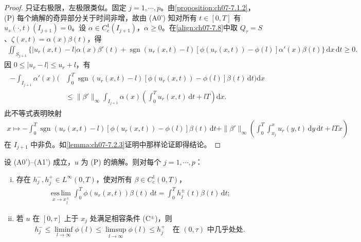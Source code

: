 \documentclass[../../main.tex]{subfiles}%
\begin{document}
\begin{proof}
只证右极限，左极限类似。固定 $j=1,\cdots ,p$。由\cref{proposition:ch07-7.1.2}，(P) 每个熵解的奇异部分关于时间非增，故由 (A0') 知对所有 $t\in[0,T]$ 有 $u_s(\cdot,t)(I_{j+1})=0$。设 $\alpha\in C^1_c(I_{j+1})$，$\alpha\geqslant0$。在\eqref{align:ch07-7.8}中取 $Q_\tau=S$、$\zeta(x,t)=\alpha(x)\beta(t)$，得
\begin{align*}
\iint_{S_{j+1}}\{|u_r(x,t)-l|\alpha(x)\beta'(t)+\operatorname{sgn}(u_r(x,t)-l)[\phi(u_r(x,t))-\phi(l)]\alpha'(x)\beta(t)\}\,\mathrm{d}x\,\mathrm{d}t\geqslant0.
\end{align*}
因 $0\leqslant|u_r-l|\leqslant u_r+l$，有
\begin{align*}
\begin{aligned}
-\int_{I_{j+1}}\alpha'(x)\bigg(&\int_0^T\operatorname{sgn}(u_r(x,t)-l)[\phi(u_r(x,t))-\phi(l)]\beta(t)\,\mathrm{d}t\bigg)\mathrm{d}x\\
&\leqslant\|\beta'\|_\infty\int_{I_{j+1}}\alpha(x)\left(\int_0^T u_r(x,t)\,\mathrm{d}t+lT\right)\mathrm{d}x.
\end{aligned}
\end{align*}
此不等式表明映射
\begin{align*}
x\mapsto-\int_0^T\operatorname{sgn}(u_r(x,t)-l)[\phi(u_r(x,t))-\phi(l)]\beta(t)\,\mathrm{d}t
+\|\beta'\|_\infty\left(\int_0^T\int_{x_j}^x u_r(y,t)\,\mathrm{d}y\,\mathrm{d}t+lTx\right)
\end{align*}
在 $I_{j+1}$ 中非负。如\cref{lemma:ch07-7.2.3}证明中那样论证即得结论。
\end{proof}

\begin{lemma}\label{lemma:ch07-7.2.6}
设 (A0')--(A1') 成立，$u$ 为 (P) 的熵解。则对每个 $j=1,\cdots ,p$：
\begin{enumerate}[(i)]
\item 存在 $h_j^-,h_j^+\in L^\infty(0,T)$，使对所有 $\beta\in C^1_c(0,T)$，
\begin{align}
\operatorname*{ess\,lim}_{x\to x_j^\pm}\int_0^T\phi(u_r(x,t))\beta(t)\,\mathrm{d}t
=\int_0^T h_j^\pm(t)\beta(t)\,\mathrm{d}t; \label{align:ch07-7.24}
\end{align}
\item 若 $u$ 在 $[0,\tau]$ 上于 $x_j$ 处满足相容条件 (C$^\pm$)，则
\begin{align}
h_j^-\leqslant\liminf_{l\to\infty}\phi(l)\leqslant\limsup_{l\to\infty}\phi(l)\leqslant h_j^+
\quad\text{在 }(0,\tau)\text{ 中几乎处处}. \label{align:ch07-7.25}
\end{align}
\end{enumerate}
\end{lemma}
\end{document}

